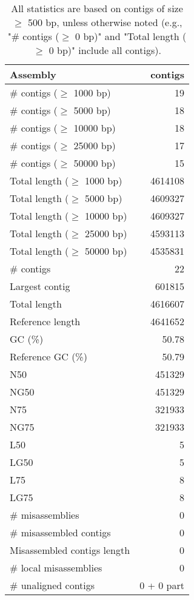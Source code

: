 \documentclass[12pt,a4paper]{article}
\begin{document}
\begin{table}[ht]
\begin{center}
\caption{All statistics are based on contigs of size $\geq$ 500 bp, unless otherwise noted (e.g., "\# contigs ($\geq$ 0 bp)" and "Total length ($\geq$ 0 bp)" include all contigs).}
\begin{tabular}{|l*{1}{|r}|}
\hline
Assembly & contigs \\ \hline
\# contigs ($\geq$ 1000 bp) & 19 \\ \hline
\# contigs ($\geq$ 5000 bp) & 18 \\ \hline
\# contigs ($\geq$ 10000 bp) & 18 \\ \hline
\# contigs ($\geq$ 25000 bp) & 17 \\ \hline
\# contigs ($\geq$ 50000 bp) & 15 \\ \hline
Total length ($\geq$ 1000 bp) & 4614108 \\ \hline
Total length ($\geq$ 5000 bp) & 4609327 \\ \hline
Total length ($\geq$ 10000 bp) & 4609327 \\ \hline
Total length ($\geq$ 25000 bp) & 4593113 \\ \hline
Total length ($\geq$ 50000 bp) & 4535831 \\ \hline
\# contigs & 22 \\ \hline
Largest contig & 601815 \\ \hline
Total length & 4616607 \\ \hline
Reference length & 4641652 \\ \hline
GC (\%) & 50.78 \\ \hline
Reference GC (\%) & 50.79 \\ \hline
N50 & 451329 \\ \hline
NG50 & 451329 \\ \hline
N75 & 321933 \\ \hline
NG75 & 321933 \\ \hline
L50 & 5 \\ \hline
LG50 & 5 \\ \hline
L75 & 8 \\ \hline
LG75 & 8 \\ \hline
\# misassemblies & 0 \\ \hline
\# misassembled contigs & 0 \\ \hline
Misassembled contigs length & 0 \\ \hline
\# local misassemblies & 0 \\ \hline
\# unaligned contigs & 0 + 0 part \\ \hline

\end{tabular}
\end{center}
\end{table}
\end{document}
